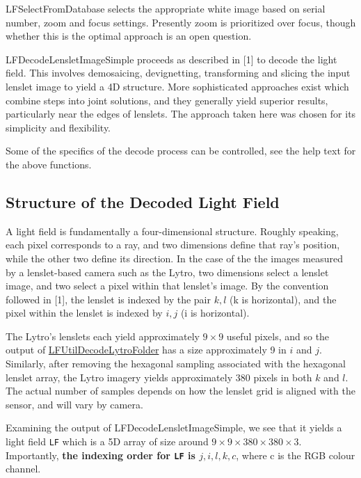 \documentclass[onecolumn]{article}
\newcommand{\CiteFunction}[1]{\hyperlink{#1}{\small #1}}
\newcommand{\SupFunction}[1]{{\small #1}}
\newcommand{\SymbolText}[1]{\texttt{\small #1}}
\begin{document}
\SupFunction{LFSelectFromDatabase} selects the appropriate white image based on serial number, zoom and focus settings. Presently zoom is prioritized over focus, though whether this is the optimal approach is an open question.

\SupFunction{LFDecodeLensletImageSimple} proceeds as described in [1] to decode the light field. This involves demosaicing, devignetting, transforming and slicing the input lenslet image to yield a 4D structure. More sophisticated approaches exist which combine steps into joint solutions, and they generally yield superior results, particularly near the edges of lenslets. The approach taken here was chosen for its simplicity and flexibility.

Some of the specifics of the decode process can be controlled, see the help text for the above functions.

\subsection{Structure of the Decoded Light Field}

A light field is fundamentally a four-dimensional structure. Roughly speaking, each pixel corresponds to a ray, and two dimensions define that ray's position, while the other two define its direction. In the case of the the images measured by a lenslet-based camera such as the Lytro, two dimensions select a lenslet image, and two select a pixel within that lenslet's image. By the convention followed in [1], the lenslet is indexed by the pair $k, l$ (k is horizontal), and the pixel within the lenslet is indexed by $i, j$ (i is horizontal).

The Lytro's lenslets each yield approximately $9 \times 9$ useful pixels, and so the output of \CiteFunction{LFUtilDecodeLytroFolder} has a size approximately 9 in $i$ and $j$. Similarly, after removing the hexagonal sampling associated with the hexagonal lenslet array, the Lytro imagery yields approximately $380$ pixels in both $k$ and $l$.  The actual number of samples depends on how the lenslet grid is aligned with the sensor, and will vary by camera.

Examining the output of \SupFunction{LFDecodeLensletImageSimple}, we see that it yields a light field \SymbolText{LF} which is a 5D array of size around $9\times9\times380\times380\times3$. Importantly, \textbf{the indexing order for \SymbolText{LF} is $j, i, l, k, c$}, where c is the RGB colour channel. 
\end{document}
